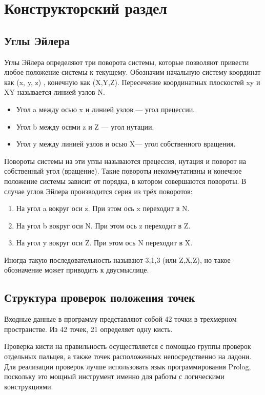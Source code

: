 \chapter{Конструкторский раздел}


\section{Углы Эйлера}
\hspace{0.6cm}Углы Эйлера определяют три поворота системы, которые позволяют привести любое положение системы к текущему. Обозначим начальную систему координат как (x, y, z) , конечную как (X,Y,Z). Пересечение координатных плоскостей xy и XY называется линией узлов N.
\begin{itemize}
	\item Угол a между осью x и линией узлов — угол прецессии.
	\item Угол b между осями z и Z — угол нутации.
	\item Угол y между линией узлов и осью  X— угол собственного вращения.
\end{itemize}

\hspace{0.6cm}Повороты системы на эти углы называются прецессия, нутация и поворот на собственный угол (вращение). Такие повороты некоммутативны и конечное положение системы зависит от порядка, в котором совершаются повороты. В случае углов Эйлера производится серия из трёх поворотов:
\begin{enumerate}
	\item На угол a вокруг оси z. При этом ось x переходит в N.
	\item На угол b вокруг оси N. При этом ось z переходит в Z.
	\item 	На угол y вокруг оси Z. При этом ось N переходит в X.
\end{enumerate}
Иногда такую последовательность называют 3,1,3 (или Z,X,Z), но такое обозначение может приводить к двусмыслице.


\section{Структура проверок положения точек}
\hspace{0.6cm}Входные данные в программу представляют собой 42 точки в трехмерном пространстве. Из 42 точек, 21 определяет одну кисть.

\hspace{0.6cm}Проверка кисти на правильность осуществляется с помощью группы проверок отдельных пальцев, а также точек расположенных непосредственно на ладони. Для реализации проверок лучше использовать язык программирования Prolog, поскольку это мощный инструмент именно для работы с логическими конструкциями.


